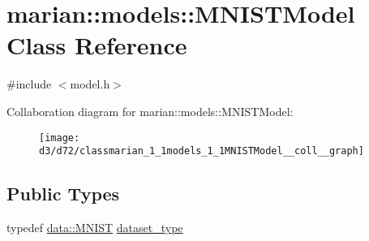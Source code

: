 \hypertarget{classmarian_1_1models_1_1MNISTModel}{}\section{marian\+:\+:models\+:\+:M\+N\+I\+S\+T\+Model Class Reference}
\label{classmarian_1_1models_1_1MNISTModel}


{\ttfamily \#include $<$model.\+h$>$}



Collaboration diagram for marian\+:\+:models\+:\+:M\+N\+I\+S\+T\+Model\+:
\nopagebreak
\begin{figure}[H]
\begin{center}
\leavevmode
\texttt{[image: d3/d72/classmarian\_1\_1models\_1\_1MNISTModel\_\_coll\_\_graph]}
\end{center}
\end{figure}
\subsection*{Public Types}
\begin{DoxyCompactItemize}
\item 
typedef \hyperlink{classmarian_1_1data_1_1MNIST}{data\+::\+M\+N\+I\+ST} \hyperlink{classmarian_1_1models_1_1MNISTModel_a51d3bba55e9fb1f82f7cf18987f22c01}{dataset\+\_\+type}
\end{DoxyCompactItemize}
